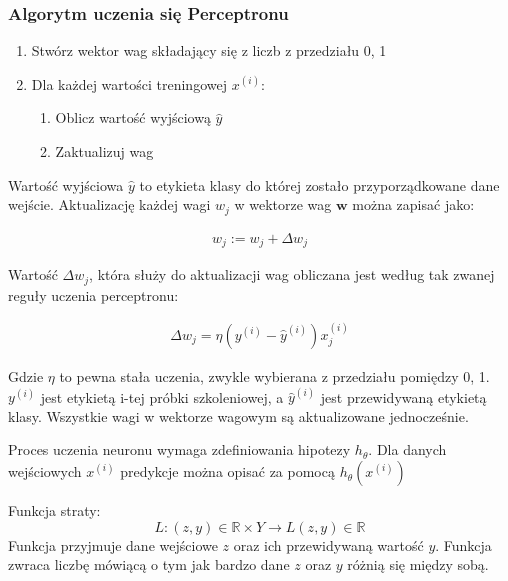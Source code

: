 \subsubsection{Algorytm uczenia się Perceptronu}   

\begin{enumerate}
	\item  Stwórz wektor wag składający się z liczb z przedziału 0, 1
	\item  Dla każdej wartości treningowej $x^{(i)}$:
		\begin{enumerate} 
			\item Oblicz wartość wyjściową $ \hat{y} $
			\item Zaktualizuj wag
			\end{enumerate}
\end{enumerate}

Wartość wyjściowa $\hat{y}$ to etykieta klasy do której zostało przyporządkowane dane wejście. Aktualizację każdej wagi $w_{j}$ w wektorze wag $\textbf{w}$ można zapisać jako:


\begin{gather*} 
w_{j} := w_{j} + \Delta w_{j}
\end{gather*}

Wartość $\Delta w_{j}$, która służy do aktualizacji wag obliczana jest według tak zwanej reguły uczenia perceptronu:

\begin{gather*} 
\Delta w_{j} = \eta ( y^{(i)} - \hat{y}^{(i)} ) x_{j}^{(i)}
\end{gather*}

Gdzie $\eta$ to pewna stała uczenia, zwykle wybierana z przedziału pomiędzy 0, 1. $y^{(i)}$ jest etykietą  i-tej próbki szkoleniowej, a $\hat{y}^{(i)}$ jest przewidywaną etykietą klasy. Wszystkie wagi w wektorze wagowym są aktualizowane jednocześnie. 

\begin{definicja}
	Proces uczenia neuronu wymaga zdefiniowania hipotezy $h_{\theta}$. Dla danych wejściowych $x^{(i)}$ predykcje można opisać za pomocą $h_{\theta}(x^(i))$
\end{definicja}

\begin{definicja} 
	Funkcja straty:
	 \begin{equation}
		  L:(z,y) \in \mathbb{R} \times Y \rightarrow L(z,y) \in \mathbb{R}
	 \end{equation}
	  Funkcja przyjmuje dane wejściowe $z$ oraz ich przewidywaną wartość $y$. Funkcja zwraca liczbę mówiącą o tym jak bardzo dane $z$ oraz $y$ różnią się między sobą.
\end{definicja}

